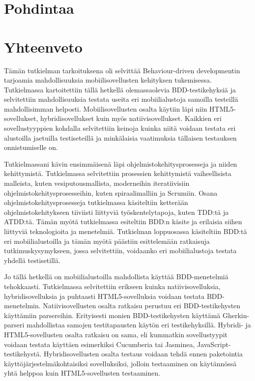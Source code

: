 \documentclass[finnish,nonumbib,nocopyright]{gradu2}
\begin{document}
\chapter{Pohdintaa}

\chapter{Yhteenveto}

Tämän tutkielman tarkoituksena oli selvittää Behaviour-driven developmentin tarjoamia mahdollisuuksia mobiilisovellusten kehityksen tukemisessa. Tutkielmassa kartoitettiin tällä hetkellä olemassaolevia BDD-testikehyksiä ja selvitettiin mahdollisuuksia testata useita eri mobiilialustoja samoilla testeillä mahdollisimman helposti. Mobiilisovellusten osalta käytiin läpi niin HTML5-sovellukset, hybridisovellukset kuin myös natiivisovellukset. Kaikkien eri sovellustyyppien kohdalla selvitettiin keinoja kuinka niitä voidaan testata eri alustoilla jaetuilla testiseteillä ja minkälaisia vaatimuksia tällaisen testauksen onnistumiselle on.

Tutkielmassani kävin ensimmäisenä läpi ohjelmistokehitysprosesseja ja niiden kehittymistä. Tutkielmassa selvitettiin prosessien kehittymistä vaiheellisista malleista, kuten vesiputousmallista, moderneihin iteratiivisiin ohjelmistokehitysprosesseihin, kuten spiraalimalliin ja Scrumiin. Osana ohjelmistokehitysprosesseja tutkielmassa käsiteltiin ketterään ohjelmistokehitykseen tiiviisti liittyviä työskentelytapoja, kuten TDD:tä ja ATDD:tä. Tämän myötä tutkielmassa esiteltiin BDD:n käsite ja erilaisia siihen liittyviä teknologioita ja menetelmiä. Tutkielman loppuosassa käsiteltiin BDD:tä eri mobiilialustoilla ja tämän myötä päästiin esittelemään ratkaisuja tutkimuskysymykseen, jossa selvitettiin, voidaanko eri mobiilialustoja testata yhdellä testisetillä.

Jo tällä hetkellä on mobiilialustoilla mahdollista käyttää BDD-menetelmiä tehokkaasti. Tutkielmassa selvitettiin erikseen kuinka natiivisovelluksia, hybridisovelluksia ja puhtaasti HTML5-sovelluksia voidaan testata BDD-menetelmin. Natiivisovellusten osalta ratkaisu perustuu eri BDD-testikehysten käyttämiin parsereihin. Erityisesti monien BDD-testikehysten käyttämä Gherkin-parseri mahdollistaa samojen testitapausten käytön eri testikehyksillä. Hybridi- ja HTML5-sovellusten osalta ratkaisu on sama, eli kummatkin sovellustyypit voidaan testata käyttäen esimerkiksi Cucumberia tai Jasminea, JavaScript-testikehystä. Hybridisovellusten osalta testaus voidaan tehdä ennen paketointia käyttöjärjestelmäkohtaisiksi sovelluksiksi, jolloin testaaminen on käytännössä yhtä helppoa kuin HTML5-sovellusten testaaminen.
\end{document}
